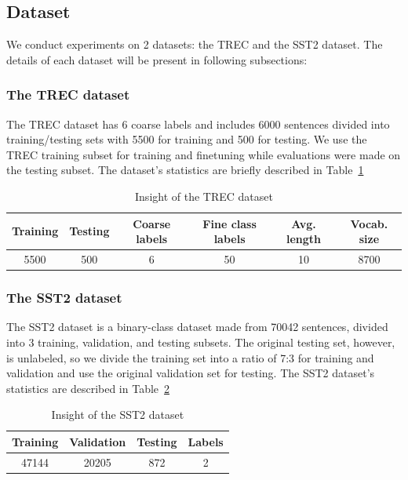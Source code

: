 \documentclass[sn-mathphys,Numbered]{sn-jnl}%
\theoremstyle{thmstyleone}%
\theoremstyle{thmstyletwo}%
\theoremstyle{thmstylethree}%
\begin{document}
\subsection{Dataset}
We conduct experiments on 2 datasets: the TREC and the SST2 dataset. The details of each dataset will be present in following subsections:

\subsubsection{The TREC dataset}
The TREC dataset\cite{hovy2001, li2002} has 6 coarse labels and includes 6000 sentences divided into training/testing sets with 5500 for training and 500 for testing. We use the TREC training subset for training and finetuning while evaluations were made on the testing subset. The dataset’s statistics are briefly described in Table~\ref{tab:trec-insight}

\begin{table}[htp]
\centering
\caption{Insight of the TREC dataset} \label{tab:trec-insight}
\begin{tabular*}{\textwidth}{@{\extracolsep\fill}cccccc}
\toprule
\textbf{Training} & \textbf{Testing} & \textbf{Coarse labels} & \textbf{Fine class labels} & \textbf{Avg. length} & \textbf{Vocab. size} \\ \midrule
5500              & 500              & 6                      & 50                         & 10                   & 8700                 \\ \bottomrule
\end{tabular*}
\end{table}

\subsubsection{The SST2 dataset}
The SST2 dataset\cite{Socher2013} is a binary-class dataset made from 70042 sentences, divided into 3 training, validation, and testing subsets. The original testing set, however, is unlabeled, so we divide the training set into a ratio of 7:3 for training and validation and use the original validation set for testing. The SST2 dataset’s statistics are described in Table~\ref{tab:sst2-insight}

\begin{table}[htp]
\centering
\caption{Insight of the SST2 dataset} \label{tab:sst2-insight}
\begin{tabular*}{\textwidth}{@{\extracolsep\fill}cccc}
\toprule
\textbf{Training} & \textbf{Validation} & \textbf{Testing} & \textbf{Labels} \\ \midrule
47144              & 20205              & 872                      & 2 \\ \bottomrule
\end{tabular*}
\end{table}
\end{document}
